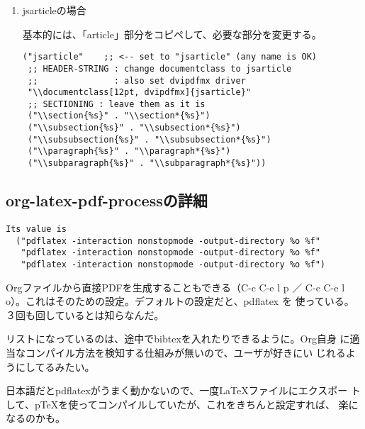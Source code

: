 \documentclass[dvipdfmx,12pt]{jsarticle}
\begin{document}
\begin{enumerate}
\item jsarticleの場合
\label{sec-3-1-2-1}

基本的には、「article」部分をコピペして、必要な部分を変更する。

\lstset{language=Lisp,label= ,caption= ,numbers=none}
\begin{lstlisting}
("jsarticle"    ;; <-- set to "jsarticle" (any name is OK)
 ;; HEADER-STRING : change documentclass to jsarticle
 ;;               : also set dvipdfmx driver
 "\\documentclass[12pt, dvipdfmx]{jsarticle}"
 ;; SECTIONING : leave them as it is
 ("\\section{%s}" . "\\section*{%s}")
 ("\\subsection{%s}" . "\\subsection*{%s}")
 ("\\subsubsection{%s}" . "\\subsubsection*{%s}")
 ("\\paragraph{%s}" . "\\paragraph*{%s}")
 ("\\subparagraph{%s}" . "\\subparagraph*{%s}"))
\end{lstlisting}
\end{enumerate}

\subsection{org-latex-pdf-processの詳細}
\label{sec-3-2}
\lstset{language=Lisp,label= ,caption= ,numbers=none}
\begin{lstlisting}
Its value is
  ("pdflatex -interaction nonstopmode -output-directory %o %f"
   "pdflatex -interaction nonstopmode -output-directory %o %f"
   "pdflatex -interaction nonstopmode -output-directory %o %f")
\end{lstlisting}

Orgファイルから直接PDFを生成することもできる（C-c C-e l p ／ C-c
C-e l o）。これはそのための設定。デフォルトの設定だと、pdflatex を
使っている。３回も回しているとは知らなんだ。

リストになっているのは、途中でbibtexを入れたりできるように。Org自身
に適当なコンパイル方法を検知する仕組みが無いので、ユーザが好きにい
じれるようにしてるみたい。

日本語だとpdflatexがうまく動かないので、一度\LaTeX{}ファイルにエクスポー
トして、pTeXを使ってコンパイルしていたが、これをきちんと設定すれば、
楽になるのかも。
\end{document}
